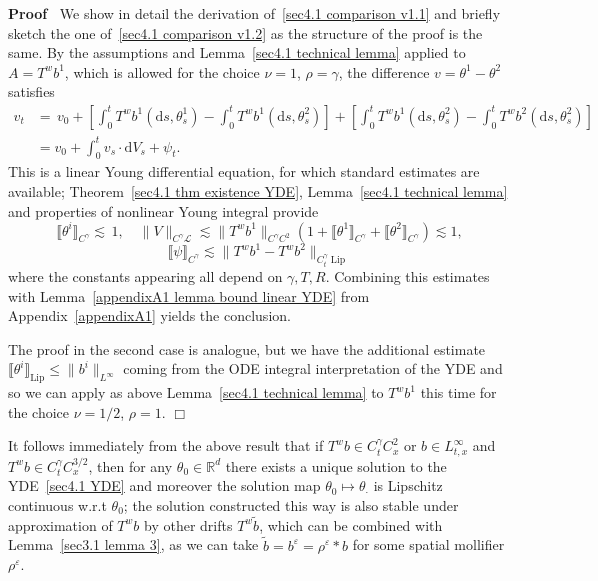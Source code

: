 \documentclass[10pt]{article}
\newcommand{\mathd}{\mathrm{d}}
\newcommand{\tmop}[1]{\ensuremath{\operatorname{#1}}}
\newenvironment{proof}{\noindent\textbf{Proof\ }}{\hspace*{\fill}$\Box$\medskip}
\begin{document}
\begin{proof}
  We show in detail the derivation of~{\eqref{sec4.1 comparison v1.1}} and
  briefly sketch the one of~{\eqref{sec4.1 comparison v1.2}} as the structure
  of the proof is the same. By the assumptions and Lemma~\ref{sec4.1 technical
  lemma} applied to $A = T^w b^1$, which is allowed for the choice $\nu = 1$,
  $\rho = \gamma$, the difference $v = \theta^1 - \theta^2$ satisfies
%  
  \begin{align*}
    v_t & = \, v_0 + \left[ \int_0^t T^w b^1 (\mathd s, \theta^1_s) - \int_0^t
    T^w b^1 (\mathd s, \theta^2_s) \right] + \left[ \int_0^t T^w b^1 (\mathd
    s, \theta^2_s) - \int_0^t T^w b^2 (\mathd s, \theta^2_s) \right]\\
    & = v_0 + \int_0^t v_s \cdot \mathd V_s + \psi_t .
  \end{align*}
  This is a linear Young differential equation, for which standard estimates
  are available; Theorem~\ref{sec4.1 thm existence YDE}, Lemma~\ref{sec4.1
  technical lemma} and properties of nonlinear Young integral provide
  \[ \llbracket \theta^i \rrbracket_{C^{\gamma}} \lesssim \, 1, \quad \| V
     \|_{C^{\gamma} \mathcal{L}} \lesssim \| T^w b^1 \|_{C^{\gamma} C^2} (1 +
     \llbracket \theta^1 \rrbracket_{C^{\gamma}} + \llbracket \theta^2
     \rrbracket_{C^{\gamma}}) \lesssim 1, \]
  \[ \llbracket \psi \rrbracket_{C^{\gamma}} \lesssim \| T^w b^1 - T^w b^2
     \|_{C^{\gamma}_t \tmop{Lip}} \]
  where the constants appearing all depend on $\gamma, T, R$. Combining this
  estimates with Lemma~\ref{appendixA1 lemma bound linear YDE} from
  Appendix~\ref{appendixA1} yields the conclusion.
  
  The proof in the second case is analogue, but we have the additional
  estimate $\llbracket \theta^i \rrbracket_{\tmop{Lip}} \leqslant \| b^i
  \|_{L^{\infty}}$ coming from the ODE integral interpretation of the YDE and
  so we can apply as above Lemma~\ref{sec4.1 technical lemma} to $T^w b^1$
  this time for the choice $\nu = 1 / 2$, $\rho = 1$.
\end{proof}

\begin{remark}
  It follows immediately from the above result that if $T^w b \in C^{\gamma}_t
  C_x^2$ or $b \in L^{\infty}_{t, x}$ and $T^w b \in C^{\gamma}_t C^{3 /
  2}_x$, then for any $\theta_0 \in \mathbb{R}^d$ there exists a unique
  solution to the YDE~{\eqref{sec4.1 YDE}} and moreover the solution map
  $\theta_0 \mapsto \theta_{\cdot}$ is Lipschitz continuous w.r.t $\theta_0$;
  the solution constructed this way is also stable under approximation of $T^w
  b$ by other drifts $T^w \tilde{b}$, which can be combined with
  Lemma~\ref{sec3.1 lemma 3}, as we can take $\tilde{b} = b^{\varepsilon} =
  \rho^{\varepsilon} \ast b$ for some spatial mollifier $\rho^{\varepsilon}$.
\end{remark}
\end{document}
